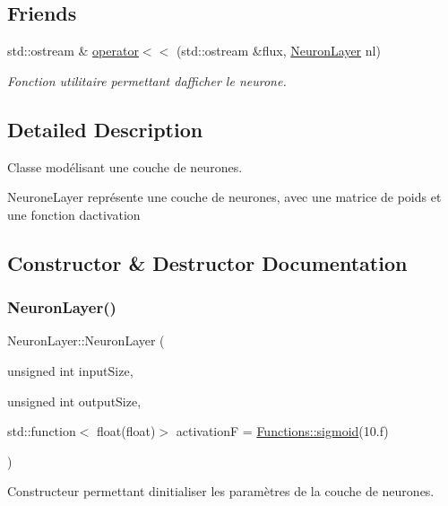 \subsection*{Friends}
\begin{DoxyCompactItemize}
\item 
std\+::ostream \& \hyperlink{classNeuronLayer_adbe40702c22550c0392b3447e5d63c9a}{operator$<$$<$} (std\+::ostream \&flux, \hyperlink{classNeuronLayer}{Neuron\+Layer} nl)
\begin{DoxyCompactList}\small\item\em Fonction utilitaire permettant d\textquotesingle{}afficher le neurone. \end{DoxyCompactList}\end{DoxyCompactItemize}


\subsection{Detailed Description}
Classe modélisant une couche de neurones. 

Neurone\+Layer représente une couche de neurones, avec une matrice de poids et une fonction d\textquotesingle{}activation 

\subsection{Constructor \& Destructor Documentation}
\mbox{\label{classNeuronLayer_afe2804871685b8103d7cd461460e7b31}} 
\subsubsection{\texorpdfstring{Neuron\+Layer()}{NeuronLayer()}}
{\footnotesize\ttfamily Neuron\+Layer\+::\+Neuron\+Layer (\begin{DoxyParamCaption}\item[{unsigned int}]{input\+Size,  }\item[{unsigned int}]{output\+Size,  }\item[{std\+::function$<$ float(float)$>$}]{activationF = {\ttfamily \hyperlink{structFunctions_a773de9cd59f7ccc3e2fe9822f0536ae4}{Functions\+::sigmoid}(10.f)} }\end{DoxyParamCaption})}



Constructeur permettant d\textquotesingle{}initialiser les paramètres de la couche de neurones. 


